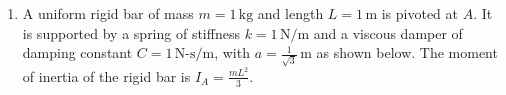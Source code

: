 \documentclass[journal]{IEEEtran}
\begin{document}
\begin{enumerate}
    \noindent The wing root bending moment in steady level flight is \( M_y = 10 \, \text{N-m} \). If the airplane flies at a load factor \( n = 3.5 \), the maximum bending stress at the root is:  \hfill (GATE AE 2009)
    \begin{multicols}{4}
        \begin{enumerate}
            \item \( 1 \times 10^6 \, \text{N/m}^2 \)
            \item \( 3.5 \times 10^6 \, \text{N/m}^2 \)
            \item \( 7 \times 10^6 \, \text{N/m}^2 \)
            \item \( 0.286 \times 10^6 \, \text{N/m}^2 \)
        \end{enumerate}
    \end{multicols}
    
    
    \item A uniform rigid bar of mass \( m = 1 \, \text{kg} \) and length \( L = 1 \, \text{m} \) is pivoted at \( A \). It is supported by a spring of stiffness \( k = 1 \, \text{N/m} \) and a viscous damper of damping constant \( C = 1 \, \text{N-s/m} \), with \( a = \frac{1}{\sqrt{3}} \, \text{m} \) as shown below. The moment of inertia of the rigid bar is \( I_A = \frac{mL^2}{3} \).
    

\end{enumerate}
\end{document}
